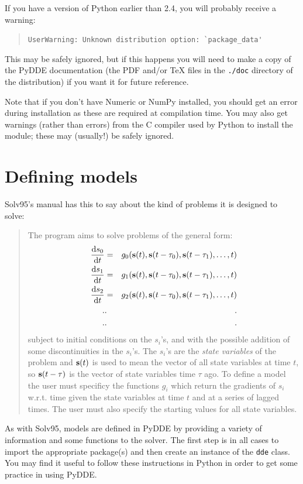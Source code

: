 \documentclass[10pt,a4paper] {article}
\newcommand{\dif}[2]{\frac{{\rm d} #1}{{\rm d} #2}}
\begin{document}
If you have a version of Python earlier than 2.4, you will probably receive a warning:  
\begin{quotation}\verb+UserWarning: Unknown distribution option: `package_data'+\end{quotation}
This may be safely ignored, but if this happens you will need to make a copy of the PyDDE documentation (the PDF and/or TeX files in the \verb+./doc+ directory of the
distribution) if you want it for future reference.

Note that if you don't have Numeric or NumPy installed, you should get an error during installation as these are required at compilation time.  You may also get warnings (rather than errors) from the C compiler used by Python to
install the module; these may (usually!) be safely ignored.


\section{Defining models}

Solv95's manual has this to say about the kind of problems it is designed to solve:
\begin{quotation}
The program aims to solve problems of the general form:
\begin{eqnarray*} 
\dif{s_0}{t} & = & g_0 ({\bf s}(t),{\bf s}(t-\tau_0), {\bf s}(t-\tau_1), \ldots,t)\\
\dif{s_1}{t} & = & g_1 ({\bf s}(t),{\bf s}(t-\tau_0), {\bf s}(t-\tau_1), \ldots,t)\\
\dif{s_2}{t} & = & g_2 ({\bf s}(t),{\bf s}(t-\tau_0), {\bf s}(t-\tau_1), \ldots,t)\\
. & . & ~~~~~~~~~. \\
. & . & ~~~~~~~~~. 
\end{eqnarray*}
subject to initial conditions on the $s_i$'s, and with the possible addition of some discontinuities in the $s_i$'s.  The $s_i$'s are the {\it state variables } of the problem and ${\bf s}(t)$ is used to mean the vector of all state variables at time $ t$, so $ {\bf s}(t-\tau)$ is the vector of state variables time $\tau $ ago.  To define a model the user must specificy the functions $g_i$ which return the gradients of $s_i$ w.r.t. time given the state variables at time $t$ and at a series of lagged times.  The user must also specify the starting values for all state variables.
\end{quotation}
As with Solv95, models are defined in PyDDE by providing a variety of information and some functions to the solver.  The first step is in all cases to import the appropriate package(s) and then create an instance of the \verb+dde+ class.  You may find it useful to follow these instructions in Python in order to get some practice in using PyDDE.
\end{document}
